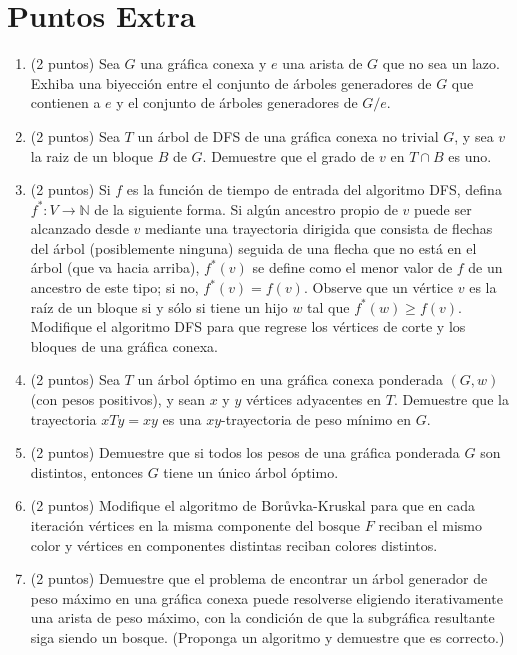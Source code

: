 \documentclass{article}
\begin{document}
\section*{Puntos Extra}
\begin{enumerate}
\item (2 puntos) Sea $G$ una gr\'afica conexa y $e$ una arista de $G$ que
  no sea un lazo. Exhiba una biyecci\'on entre el conjunto de \'arboles
  generadores de $G$ que contienen a $e$ y el conjunto de \'arboles
  generadores de $G / e$.

\item (2 puntos) Sea $T$ un \'arbol de DFS de una gr\'afica conexa no
  trivial $G$, y sea $v$ la raiz de un bloque $B$ de $G$.   Demuestre
  que el grado de $v$ en $T \cap B$ es uno.

\item (2 puntos)  Si $f$ es la funci\'on de tiempo de entrada del
  algoritmo DFS, defina $f^\ast\colon V \to \mathbb{N}$ de la siguiente
  forma.   Si alg\'un ancestro propio de $v$ puede ser alcanzado desde
  $v$ mediante una trayectoria dirigida que consista de flechas del
  \'arbol (posiblemente ninguna) seguida de una flecha que no est\'a en
  el \'arbol (que va hacia arriba), $f^\ast (v)$ se define como el menor
  valor de $f$ de un ancestro de este tipo; si no, $f^\ast (v) = f(v)$.
  Observe que un v\'ertice $v$ es la ra\'iz de un bloque si y s\'olo si
  tiene un hijo $w$ tal que $f^\ast (w) \ge f(v)$.   Modifique el algoritmo
  DFS para que regrese los v\'ertices de corte y los bloques de una
  gr\'afica conexa.

\item (2 puntos) Sea $T$ un \'arbol \'optimo en una gr\'afica conexa
  ponderada $(G,w)$ (con pesos positivos), y sean $x$ y $y$ v\'ertices
  adyacentes en $T$. Demuestre que la trayectoria $xTy = xy$ es una
  $xy$-trayectoria de peso m\'inimo en $G$.

\item (2 puntos) Demuestre que si todos los pesos de una gr\'afica
  ponderada $G$ son distintos, entonces $G$ tiene un \'unico \'arbol
  \'optimo.

\item (2 puntos) Modifique el algoritmo de Bor\r uvka-Kruskal para que en cada
  iteraci\'on v\'ertices en la misma componente del bosque $F$ reciban el
  mismo color y v\'ertices en componentes distintas reciban colores distintos.

\item (2 puntos) Demuestre que el problema de encontrar un \'arbol generador
  de peso m\'aximo en una gr\'afica conexa puede resolverse eligiendo
  iterativamente una arista de peso m\'aximo, con la condici\'on de que la
  subgr\'afica resultante siga siendo un bosque. (Proponga un algoritmo y
  demuestre que es correcto.)


\end{enumerate}
\end{document}
